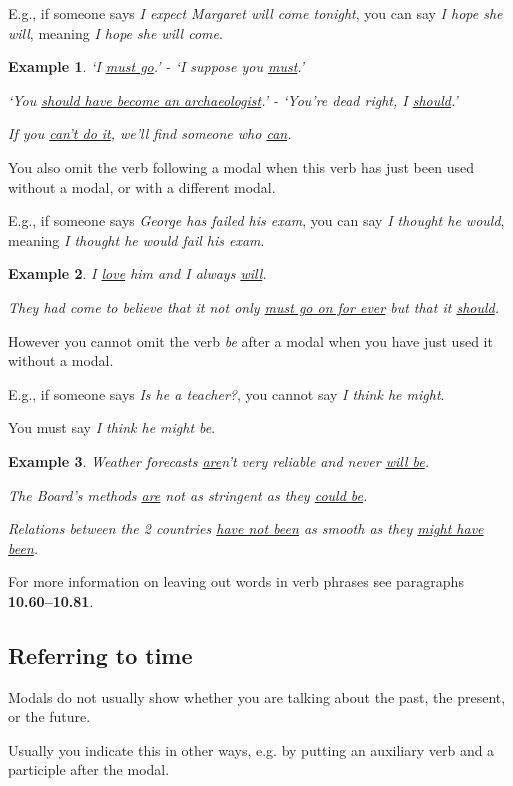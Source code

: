 \documentclass[oneside]{book}
\numberwithin{equation}{section}
\newtheorem{example}{Example}[section]
\begin{document}
E.g., if someone says \textit{I expect Margaret will come tonight}, you can say \textit{I hope she will}, meaning \textit{I hope she will come}.
\begin{example}
    `I \underline{must go}.' - `I suppose you \underline{must}.'
    
    `You \underline{should have become an archaeologist}.' - `You're dead right, I \underline{should}.'
    
    If you \underline{can't do it}, we'll find someone who \underline{can}.
\end{example}
You also omit the verb following a modal when this verb has just been used without a modal, or with a different modal.

E.g., if someone says \textit{George has failed his exam}, you can say \textit{I thought he would}, meaning \textit{I thought he would fail his exam}.
\begin{example}
    I \underline{love} him and I always \underline{will}.
    
    They had come to believe that it not only \underline{must go on for ever} but that it \underline{should}.
\end{example}
However you cannot omit the verb \textit{be} after a modal when you have just used it without a modal.

E.g., if someone says \textit{Is he a teacher?}, you cannot say \textit{I think he might}.

You must say \textit{I think he might be}.
\begin{example}
    Weather forecasts \underline{are}n't very reliable and never \underline{will be}.
    
    The Board's methods \underline{are} not as stringent as they \underline{could be}.
    
    Relations between the 2 countries \underline{have not been} as smooth as they \underline{might have been}.
\end{example}
For more information on leaving out words in verb phrases see paragraphs \textbf{10.60--10.81}.

\subsection{Referring to time}
\noindent{} Modals do not usually show whether you are talking about the past, the present, or the future.

Usually you indicate this in other ways, e.g. by putting an auxiliary verb and a participle after the modal.
\end{document}
